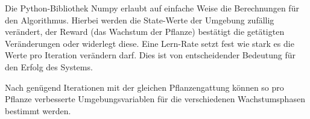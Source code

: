 Die Python-Bibliothek Numpy erlaubt auf einfache Weise die Berechnungen für den Algorithmus. Hierbei werden die State-Werte der Umgebung zufällig verändert, der Reward (das Wachstum der Pflanze) bestätigt die getätigten Veränderungen oder widerlegt diese.\cite{mathworks2024qlearning} Eine Lern-Rate setzt fest wie stark es die Werte pro Iteration verändern darf. Dies ist von entscheidender Bedeutung für den Erfolg des Systems.

Nach genügend Iterationen mit der gleichen Pflanzengattung können so pro Pflanze verbesserte Umgebungsvariablen für die verschiedenen Wachstumsphasen bestimmt werden.
